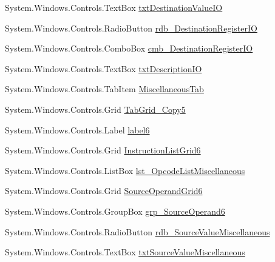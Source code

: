 \begin{DoxyCompactItemize}
System.\+Windows.\+Controls.\+Text\+Box \hyperlink{class_c_p_u___o_s___simulator_1_1_instructions_window_afd9084fd83f0c60a4fa1bba1cbcaf5af}{txt\+Destination\+Value\+I\+O}
\item 
System.\+Windows.\+Controls.\+Radio\+Button \hyperlink{class_c_p_u___o_s___simulator_1_1_instructions_window_a507ebe0998697ce8b2345fac2d9498a1}{rdb\+\_\+\+Destination\+Register\+I\+O}
\item 
System.\+Windows.\+Controls.\+Combo\+Box \hyperlink{class_c_p_u___o_s___simulator_1_1_instructions_window_a821452c6d5ab7be60996d3171a2d4cf1}{cmb\+\_\+\+Destination\+Register\+I\+O}
\item 
System.\+Windows.\+Controls.\+Text\+Box \hyperlink{class_c_p_u___o_s___simulator_1_1_instructions_window_a278020eeca6ae302ab5530cca856acde}{txt\+Description\+I\+O}
\item 
System.\+Windows.\+Controls.\+Tab\+Item \hyperlink{class_c_p_u___o_s___simulator_1_1_instructions_window_ab7e1bbdc8bb2830d39fb9a4339aa27f2}{Miscellaneous\+Tab}
\item 
System.\+Windows.\+Controls.\+Grid \hyperlink{class_c_p_u___o_s___simulator_1_1_instructions_window_a495a21e0e96f26f87d3e379ab286256b}{Tab\+Grid\+\_\+\+Copy5}
\item 
System.\+Windows.\+Controls.\+Label \hyperlink{class_c_p_u___o_s___simulator_1_1_instructions_window_a23cbea70a5e1ab92348a9569f362db07}{label6}
\item 
System.\+Windows.\+Controls.\+Grid \hyperlink{class_c_p_u___o_s___simulator_1_1_instructions_window_a6c86a044f242ee64f312f0105bac6d36}{Instruction\+List\+Grid6}
\item 
System.\+Windows.\+Controls.\+List\+Box \hyperlink{class_c_p_u___o_s___simulator_1_1_instructions_window_a3ac59be147d3323d2b485551b3a3640a}{lst\+\_\+\+Opcode\+List\+Miscellaneous}
\item 
System.\+Windows.\+Controls.\+Grid \hyperlink{class_c_p_u___o_s___simulator_1_1_instructions_window_a1036ae92003998bc7e7062a73358adec}{Source\+Operand\+Grid6}
\item 
System.\+Windows.\+Controls.\+Group\+Box \hyperlink{class_c_p_u___o_s___simulator_1_1_instructions_window_a46c1f50385d01108637e574343a99bfd}{grp\+\_\+\+Source\+Operand6}
\item 
System.\+Windows.\+Controls.\+Radio\+Button \hyperlink{class_c_p_u___o_s___simulator_1_1_instructions_window_ae6e33f7879251b63282f5d3eaa693507}{rdb\+\_\+\+Source\+Value\+Miscellaneous}
\item 
System.\+Windows.\+Controls.\+Text\+Box \hyperlink{class_c_p_u___o_s___simulator_1_1_instructions_window_a555d604d5869d89442a35900abc35914}{txt\+Source\+Value\+Miscellaneous}

\end{DoxyCompactItemize}
